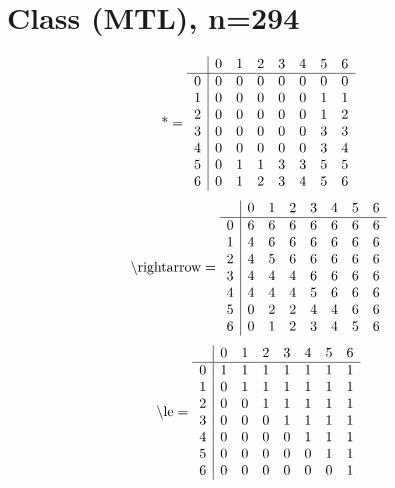 \documentclass[11pt]{article}
\begin{document}
\section{Class (MTL), n=294}
\[\text{*} = 
\begin{array}{r | r r r r r r r}
 & 0 & 1 & 2 & 3 & 4 & 5 & 6 \\ \hline
0 & 0 & 0 & 0 & 0 & 0 & 0 & 0 \\
1 & 0 & 0 & 0 & 0 & 0 & 1 & 1 \\
2 & 0 & 0 & 0 & 0 & 0 & 1 & 2 \\
3 & 0 & 0 & 0 & 0 & 0 & 3 & 3 \\
4 & 0 & 0 & 0 & 0 & 0 & 3 & 4 \\
5 & 0 & 1 & 1 & 3 & 3 & 5 & 5 \\
6 & 0 & 1 & 2 & 3 & 4 & 5 & 6 \\
\end{array}
\]
\[\text{\textbackslash rightarrow} = 
\begin{array}{r | r r r r r r r}
 & 0 & 1 & 2 & 3 & 4 & 5 & 6 \\ \hline
0 & 6 & 6 & 6 & 6 & 6 & 6 & 6 \\
1 & 4 & 6 & 6 & 6 & 6 & 6 & 6 \\
2 & 4 & 5 & 6 & 6 & 6 & 6 & 6 \\
3 & 4 & 4 & 4 & 6 & 6 & 6 & 6 \\
4 & 4 & 4 & 4 & 5 & 6 & 6 & 6 \\
5 & 0 & 2 & 2 & 4 & 4 & 6 & 6 \\
6 & 0 & 1 & 2 & 3 & 4 & 5 & 6 \\
\end{array}
\]
\[\text{\textbackslash le} = 
\begin{array}{r | r r r r r r r}
 & 0 & 1 & 2 & 3 & 4 & 5 & 6 \\ \hline
0 & 1 & 1 & 1 & 1 & 1 & 1 & 1 \\
1 & 0 & 1 & 1 & 1 & 1 & 1 & 1 \\
2 & 0 & 0 & 1 & 1 & 1 & 1 & 1 \\
3 & 0 & 0 & 0 & 1 & 1 & 1 & 1 \\
4 & 0 & 0 & 0 & 0 & 1 & 1 & 1 \\
5 & 0 & 0 & 0 & 0 & 0 & 1 & 1 \\
6 & 0 & 0 & 0 & 0 & 0 & 0 & 1 \\
\end{array}
\]
\end{document}
